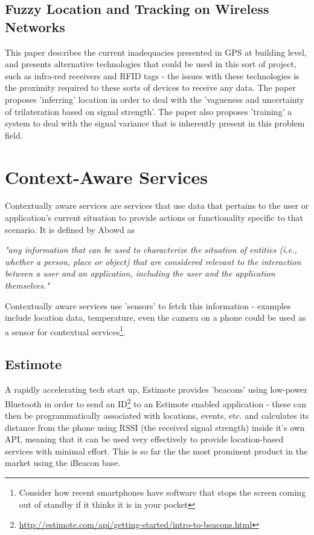 \documentclass[11pt]{informatics-report}
\begin{document}
\subsection{Fuzzy Location and Tracking on Wireless Networks\cite{Astrain:2006:FLT:1164783.1164798}} 

This paper describes the current inadequacies presented in GPS at building level, and presents alternative technologies that could be used in this sort of project, such as infra-red receivers and RFID tags - the issues with these technologies is the proximity required to these sorts of devices to receive any data. The paper proposes 'inferring' location in order to deal with the 'vagueness and uncertainty of trilateration based on signal strength'\cite{Astrain:2006:FLT:1164783.1164798}. The paper also proposes 'training' a system to deal with the signal variance that is inherently present in this problem field. 

\section{Context-Aware Services}

Contextually aware services are services that use data that pertains to the user or application's current situation to provide actions or functionality specific to that scenario. It is defined by Abowd as 

\textit{ "any information that can be used to characterize the situation of entities (i.e., whether a person, place or object) that are considered relevant to the interaction between a user and an application, including the user and the application themselves." }\cite{abowd1999towards}

Contextually aware services use 'sensors' to fetch this information - examples include location data, temperature, even the camera on a phone could be used as a sensor for contextual services\footnote{Consider how recent smartphones have software that stops the screen coming out of standby if it thinks it is in your pocket}.

\subsection{Estimote}

A rapidly accelerating tech start up, Estimote provides 'beacons' using low-power Bluetooth in order to send an ID\footnote{\url{http://estimote.com/api/getting-started/intro-to-beacons.html}} to an Estimote enabled application - these can then be programmatically associated with locations, events, etc. and calculates its distance from the phone using RSSI (the received signal strength) inside it's own API, meaning that it can be used very effectively to provide location-based services with minimal effort. This is so far the the most prominent product in the market using the iBeacon base.
\end{document}
